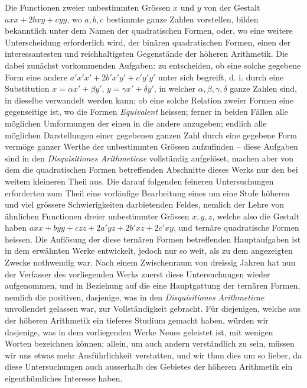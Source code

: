 \documentclass[12pt]{article}
\begin{document}
Die Functionen zweier unbestimmten Grössen $x$ und $y$ von der Gestalt $axx+2bxy+cyy$, wo $a,b,c$ bestimmte ganze Zahlen vorstellen, bilden bekanntlich unter dem Namen der quadratischen Formen, oder, wo eine weitere Unterscheidung erforderlich wird, der binären quadratischen Formen, einen der interessantesten und reichhaltigsten Gegenstände der höheren Arithmetik. Die dabei zunächst vorkommenden Aufgaben: zu entscheiden, ob eine solche gegebene Form eine andere $a'x'x'+2b'x'y'+c'y'y'$ unter sich begreift, d. i. durch eine Substitution $x=\alpha x'+\beta y'$, $y=\gamma x'+\delta y'$, in welcher $\alpha,\beta,\gamma,\delta$ ganze Zahlen sind, in dieselbe verwandelt werden kann; ob eine solche Relation zweier Formen eine gegenseitige ist, wo die Formen \textit{Equivalent} heissen; ferner in beiden Fällen alle möglichen Umformungen der einen in die andere anzugeben; endlich alle möglichen Darstellungen einer gegebenen ganzen Zahl durch eine gegebene Form vermöge ganzer Werthe der unbestimmten Grössen aufzufinden -- diese Aufgaben sind in den \textit{Disquisitiones Arithmeticae} vollständig aufgelöset, machen aber von dem die quadratischen Formen betreffenden Abschnitte dieses Werks nur den bei weitem kleineren Theil aus. Die darauf folgenden feineren Untersuchungen erforderten zum Theil eine vorläufige Bearbeitung eines um eine Stufe höheren und viel grössere Schwierigkeiten darbietenden Feldes, nemlich der Lehre von ähnlichen Functionen dreier unbestimmter Grössen $x,y,z$, welche also die Gestalt haben $axx+byy+czz+2a'yz+2b'xz+2c'xy$, und ternäre quadratische Formen heissen. Die Auflösung der diese ternären Formen betreffenden Hauptaufgaben ist in dem erwähnten Werke entwickelt, jedoch nur so weit, als zu dem angezeigten Zwecke nothwendig war. Nach einem Zwischenraum von dreissig Jahren hat nun der Verfasser des vorliegenden Werks zuerst diese Untersuchungen wieder aufgenommen, und in Beziehung auf die eine Hauptgattung der ternären Formen, nemlich die positiven, dasjenige, was in den \textit{Disquisitiones Arithmeticae} unvollendet gelassen war, zur Vollständigkeit gebracht. Für diejenigen, welche aus der höheren Arithmetik ein tieferes Studium gemacht haben, würden wir dasjenige, was in dem vorliegenden Werke Neues geleistet ist, mit wenigen Worten bezeichnen können; allein, um auch andern verständlich zu sein, müssen wir uns etwas mehr Ausführlichkeit verstatten, und wir thun dies um so lieber, da diese Untersuchungen auch ausserhalb des Gebietes der höheren Arithmetik ein eigenthümliches Interesse haben.
\end{document}
